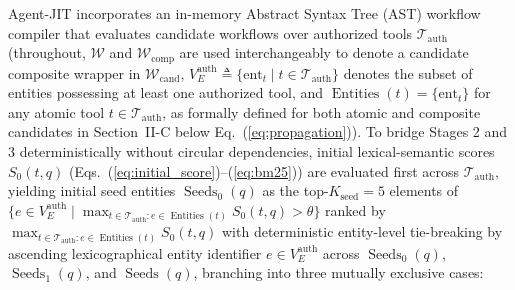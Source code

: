 \documentclass[conference,10pt]{IEEEtran}
\begin{document}
Agent-JIT incorporates an in-memory Abstract Syntax Tree (AST) workflow compiler that evaluates candidate workflows over authorized tools $\mathcal{T}_{\text{auth}}$ (throughout, $\mathcal{W}$ and $\mathcal{W}_{\text{comp}}$ are used interchangeably to denote a candidate composite wrapper in $\mathcal{W}_{\text{cand}}$, $V_E^{\text{auth}} \triangleq \{\text{ent}_t \mid t \in \mathcal{T}_{\text{auth}}\}$ denotes the subset of entities possessing at least one authorized tool, and $\operatorname{Entities}(t) = \{\text{ent}_t\}$ for any atomic tool $t \in \mathcal{T}_{\text{auth}}$, as formally defined for both atomic and composite candidates in Section~II-C below Eq.~(\ref{eq:propagation})). To bridge Stages 2 and 3 deterministically without circular dependencies, initial lexical-semantic scores $S_0(t, q)$ (Eqs.~(\ref{eq:initial_score})--(\ref{eq:bm25})) are evaluated first across $\mathcal{T}_{\text{auth}}$, yielding initial seed entities $\operatorname{Seeds}_0(q)$ as the top-$K_{\text{seed}} = 5$ elements of $\{e \in V_E^{\text{auth}} \mid \max_{t \in \mathcal{T}_{\text{auth}} : e \in \operatorname{Entities}(t)} S_0(t, q) > \theta\}$ ranked by $\max_{t \in \mathcal{T}_{\text{auth}} : e \in \operatorname{Entities}(t)} S_0(t, q)$ with deterministic entity-level tie-breaking by ascending lexicographical entity identifier $e \in V_E^{\text{auth}}$ across $\operatorname{Seeds}_0(q)$, $\operatorname{Seeds}_1(q)$, and $\operatorname{Seeds}(q)$, branching into three mutually exclusive cases:
\end{document}
